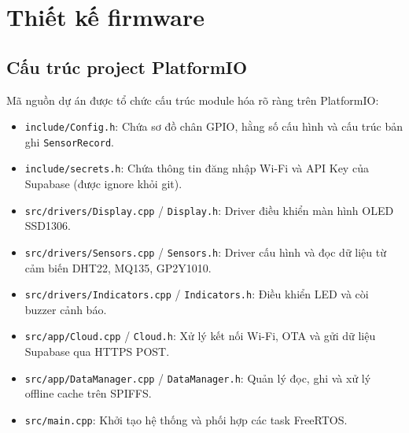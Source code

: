\section{Thiết kế firmware}
\subsection{Cấu trúc project PlatformIO}
Mã nguồn dự án được tổ chức cấu trúc module hóa rõ ràng trên PlatformIO:
\begin{itemize}
    \item \texttt{include/Config.h}: Chứa sơ đồ chân GPIO, hằng số cấu hình và cấu trúc bản ghi \texttt{SensorRecord}.
    \item \texttt{include/secrets.h}: Chứa thông tin đăng nhập Wi-Fi và API Key của Supabase (được ignore khỏi git).
    \item \texttt{src/drivers/Display.cpp} / \texttt{Display.h}: Driver điều khiển màn hình OLED SSD1306.
    \item \texttt{src/drivers/Sensors.cpp} / \texttt{Sensors.h}: Driver cấu hình và đọc dữ liệu từ cảm biến DHT22, MQ135, GP2Y1010.
    \item \texttt{src/drivers/Indicators.cpp} / \texttt{Indicators.h}: Điều khiển LED và còi buzzer cảnh báo.
    \item \texttt{src/app/Cloud.cpp} / \texttt{Cloud.h}: Xử lý kết nối Wi-Fi, OTA và gửi dữ liệu Supabase qua HTTPS POST.
    \item \texttt{src/app/DataManager.cpp} / \texttt{DataManager.h}: Quản lý đọc, ghi và xử lý offline cache trên SPIFFS.
    \item \texttt{src/main.cpp}: Khởi tạo hệ thống và phối hợp các task FreeRTOS.
\end{itemize}

